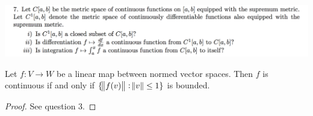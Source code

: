 \documentclass[12pt]{article}
\begin{document}
\newpage
\begin{mdframed}
\includegraphics[width=400pt]{img/oxford-a2-1-7.png}
\end{mdframed}


\begin{mdframed}
\begin{lemma*}
  Let $f:V \to W$ be a linear map between normed vector spaces. Then $f$ is continuous if and only
  if $\{\norm{f(v)} : \norm{v} \leq 1 \}$ is bounded.
\end{lemma*}

\begin{proof}
  See question 3.
\end{proof}
\end{mdframed}

\end{document}
